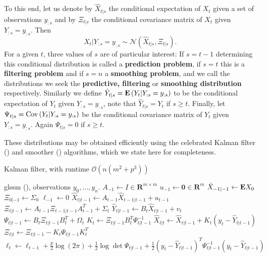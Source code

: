 To this end, let us denote by $\hat X_{t | s}$ the conditional expectation of $X_{t}$ given a set of observations $y_{:s}$ and by $\Xi_{t | s}$ the conditional covariance matrix of $X_{t}$ given $Y_{:s} = y_{:s}$. Then $$X_{t} | Y_{:s} = y_{:s} \sim \mathcal N \left( \hat X_{t|s}, \Xi_{t|s} \right).$$ For a given $t$, three values of $s$ are of particular interest: If $s = t - 1$ determining this conditional distribution is called a \textbf{prediction problem}, if $s = t$ this is a \textbf{filtering problem} and if $s = n$ a \textbf{smoothing problem}, and we call the distributions we seek the \textbf{predictive, filtering} or \textbf{smoothing distribution} respectively. 
Similarly we define $\hat Y_{t|s} = \mathbf E \left( Y_{t} \middle| Y_{:s} = y_{:s} \right)$ to be the conditional expectation of $Y_{t}$ given $Y_{:s}=y_{:s}$, note that $\hat Y_{t|s} = Y_{t}$ if $s \geq t$. Finally, let $\Psi_{t|s} = \text{Cov} \left( Y_{t} | Y_{:s} = y_{:s} \right)$ be the conditional covariance matrix of $Y_{t}$ given $Y_{:s} = y_{:s}$. Again $\Psi_{t|s} = 0$ if $s \geq t$. 

These distributions may be obtained efficiently using the celebrated Kalman filter () and smoother () algorithms, which we state here for completeness.

\begin{algorithm}
    \caption{Kalman filter, with runtime $\mathcal O(n(m^{2} + p^{3}))$}
    \label{alg:kalman_filter}
    \begin{algorithmic}
        \Require \gls{glssm} (), observations $y_{0}, \dots, y_{n}$.
        \State $A_{-1} \gets I \in \mathbf R^{m\times m}$ 
        \State $u_{-1} \gets \mathbf 0 \in \mathbf R^{m}$ 
        \State $\hat X_{-1|-1} \gets \mathbf E X_0$
        \State $\Xi_{0|-1} \gets \Sigma_{0}$
        \State $\ell_{-1} \gets 0$
            \State $\hat X_{t| t - 1} \gets A_{t-1} \hat X_{t-1|t-1} + u_{t-1}$ 
            \State $\Xi_{t | t - 1} \gets A_{t - 1} \Xi_{t - 1 | t - 1 } A_{t - 1}^{T} + \Sigma_{t}$ 
            \State $\hat Y_{t|t - 1} \gets B_{t}\hat X_{t | t - 1} + v_{t}$
            \State $\Psi_{t|t - 1} \gets B_{t}\Xi_{t | t - 1} B_{t}^T + \Omega_{t}$
            \State $K_t \gets \Xi_{t | t - 1} B_{t}^T \Psi_{t | t - 1} ^{-1}$ 
            \State $\hat X_{t | t} \gets \hat X_{t | t - 1} + K_t (y_{t} - \hat Y_{t | t - 1})$
            \State $\Xi_{t| t } \gets \Xi_{t | t - 1} - K_t \Psi_{t| t - 1} K_t^T$
            \State $\ell_{t} \gets \ell_{t - 1} + \frac{p}{2} \log (2\pi) + \frac{1}{2}\log\det \Psi_{t|t -1} + \frac{1}{2} \left( y_{t} - \hat Y_{t | t - 1} \right)^{T} \Psi_{t|t-1}^{-1} \left( y_{t} - \hat Y_{t | t - 1} \right) $ 
        \EndFor
    \end{algorithmic}
\end{algorithm}

